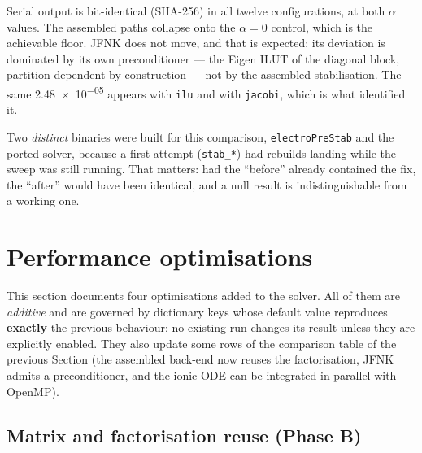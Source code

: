 \documentclass[11pt,a4paper]{article}
\newcommand{\code}[1]{\texttt{\small #1}}
\begin{document}
Serial output is bit-identical (SHA-256) in all twelve configurations, at both
$\alpha$ values. The assembled paths collapse onto the $\alpha=0$ control, which
is the achievable floor. JFNK does not move, and that is expected: its deviation
is dominated by its own preconditioner --- the Eigen ILUT of the diagonal block,
partition-dependent by construction --- not by the assembled stabilisation. The
same \num{2.48e-05} appears with \code{ilu} and with \code{jacobi}, which is what
identified it.

Two \emph{distinct} binaries were built for this comparison,
\code{electroPreStab} and the ported solver, because a first attempt
(\code{stab\_*}) had rebuilds landing while the sweep was still running. That
matters: had the ``before'' already contained the fix, the ``after'' would have
been identical, and a null result is indistinguishable from a working one.


\section{Performance optimisations}
\label{sec:optim}

This section documents four optimisations added to the solver. All of them are
\emph{additive} and are governed by dictionary keys whose default
value reproduces \textbf{exactly} the previous behaviour: no existing
run changes its result unless they are explicitly enabled. They also update
some rows of the comparison table of the previous Section (the assembled
back-end now reuses the factorisation, JFNK admits a preconditioner,
and the ionic ODE can be integrated in parallel with OpenMP).

\subsection{Matrix and factorisation reuse (Phase B)}
\label{sec:optim-B}
\end{document}
